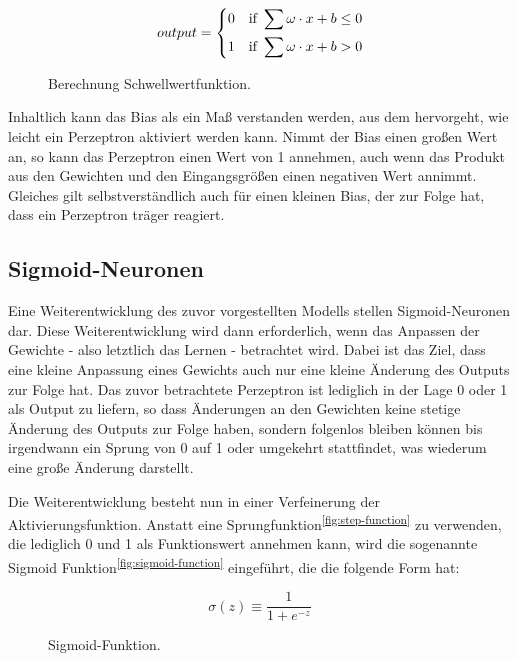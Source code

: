 \begin{figure}[h]
    \centering
    \[ output =
          \begin{dcases}
            0 \quad \text{if } \sum \omega \cdot x + b \leq 0 \\
            1 \quad \text{if } \sum \omega \cdot x + b > 0
          \end{dcases}
    \]
    \caption{Berechnung Schwellwertfunktion.}
    \label{fig:bias-calculation}
\end{figure}

Inhaltlich kann das Bias als ein Maß verstanden werden, aus dem hervorgeht, wie leicht ein Perzeptron aktiviert
werden kann. Nimmt der Bias einen großen Wert an, so kann das Perzeptron einen Wert von 1 annehmen, auch wenn das
Produkt aus den Gewichten und den Eingangsgrößen einen negativen Wert annimmt. Gleiches gilt selbstverständlich auch für
einen kleinen Bias, der zur Folge hat, dass ein Perzeptron träger reagiert.

\subsection{Sigmoid-Neuronen}

Eine Weiterentwicklung des zuvor vorgestellten Modells stellen Sigmoid-Neuronen dar. Diese Weiterentwicklung wird
dann erforderlich, wenn das Anpassen der Gewichte - also letztlich das Lernen - betrachtet wird. Dabei ist das Ziel,
dass eine kleine Anpassung eines Gewichts auch nur eine kleine Änderung des Outputs zur Folge hat. Das zuvor
betrachtete Perzeptron ist lediglich in der Lage 0 oder 1 als Output zu liefern, so dass Änderungen an den Gewichten
keine stetige Änderung des Outputs zur Folge haben, sondern folgenlos bleiben können bis irgendwann ein Sprung von 0
auf 1 oder umgekehrt stattfindet, was wiederum eine große Änderung darstellt.

Die Weiterentwicklung besteht nun in einer Verfeinerung der Aktivierungsfunktion. Anstatt eine Sprungfunktion\textsuperscript{\ref{fig:step-function}} zu
verwenden, die lediglich 0 und 1 als Funktionswert annehmen kann, wird die sogenannte Sigmoid Funktion\textsuperscript{\ref{fig:sigmoid-function}} eingeführt,
die die folgende Form hat:

\begin{figure}[h]
    \centering
    \[ \sigma(z) \equiv
          \frac{1}{1+e^{-z}}
    \]
    \caption{Sigmoid-Funktion.}
    \label{fig:sigmoid}
\end{figure}

